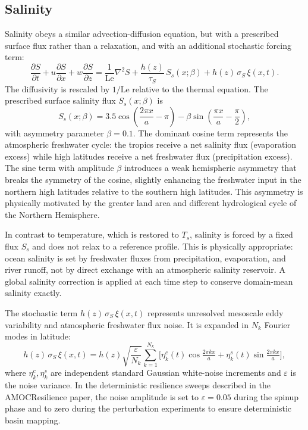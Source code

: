 \documentclass[12pt, a4paper]{article}
\newcommand{\Le}{\mathrm{Le}}
\newcommand{\pd}[2]{\frac{\partial #1}{\partial #2}}
\newcommand{\lap}{\nabla^2}
\begin{document}
\subsection{Salinity}
\label{sec:salt}

Salinity obeys a similar advection-diffusion equation, but with a prescribed
surface flux rather than a relaxation, and with an additional stochastic
forcing term:
\begin{equation}
  \pd{S}{t} + u\pd{S}{x} + w\pd{S}{z}
  = \frac{1}{\Le}\lap S
    + \frac{h(z)}{\tau_S}\,S_s(x;\beta)
    + h(z)\,\sigma_S\,\xi(x,t).
  \label{eq:S}
\end{equation}
The diffusivity is rescaled by $1/\Le$ relative to the thermal equation. The
prescribed surface salinity flux $S_s(x;\beta)$ is
\begin{equation}
  S_s(x;\beta) =
    3.5\cos\!\left(\frac{2\pi x}{a} - \pi\right)
    - \beta\sin\!\left(\frac{\pi x}{a} - \frac{\pi}{2}\right),
  \label{eq:Ss}
\end{equation}
with asymmetry parameter $\beta = 0.1$. The dominant cosine term represents
the atmospheric freshwater cycle: the tropics receive a net salinity flux
(evaporation excess) while high latitudes receive a net freshwater flux
(precipitation excess). The sine term with amplitude $\beta$ introduces a
weak hemispheric asymmetry that breaks the symmetry of the cosine, slightly
enhancing the freshwater input in the northern high latitudes relative to the
southern high latitudes. This asymmetry is physically motivated by the greater
land area and different hydrological cycle of the Northern Hemisphere.

In contrast to temperature, which is restored to $T_s$, salinity is forced
by a fixed flux $S_s$ and does not relax to a reference profile. This is
physically appropriate: ocean salinity is set by freshwater fluxes from
precipitation, evaporation, and river runoff, not by direct exchange with an
atmospheric salinity reservoir. A global salinity correction is applied at
each time step to conserve domain-mean salinity exactly.

The stochastic term $h(z)\,\sigma_S\,\xi(x,t)$ represents unresolved
mesoscale eddy variability and atmospheric freshwater flux noise. It is
expanded in $N_k$ Fourier modes in latitude:
\begin{equation}
  h(z)\,\sigma_S\,\xi(x,t)
  = h(z)\sqrt{\frac{\varepsilon}{N_k}}
    \sum_{k=1}^{N_k}\bigl[
      \eta_k^c(t)\cos\!\tfrac{2\pi kx}{a}
      + \eta_k^s(t)\sin\!\tfrac{2\pi kx}{a}
    \bigr],
\end{equation}
where $\eta_k^c, \eta_k^s$ are independent standard Gaussian white-noise
increments and $\varepsilon$ is the noise variance. In the deterministic
resilience sweeps described in the AMOCResilience paper, the noise amplitude
is set to $\varepsilon = 0.05$ during the spinup phase and to zero during the
perturbation experiments to ensure deterministic basin mapping.
\end{document}
